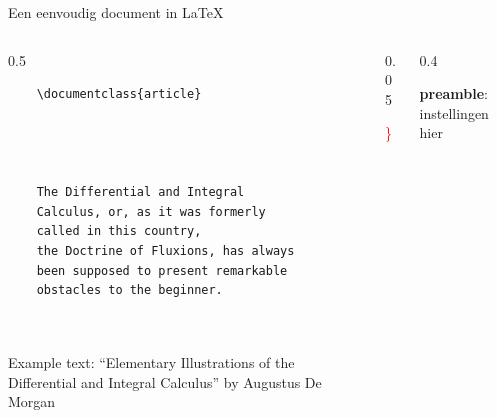 \copyrightTim

\begin{frame}[fragile, t]{Een eenvoudig document in \LaTeX}
	\begin{columns}[t]
        \begin{column}{0.5\textwidth}
			\vspace{-20pt}
	\begin{verbatim} 
	\documentclass{article}

		
	

	The Differential and Integral 
	Calculus, or, as it was formerly 
	called in this country, 
	the Doctrine of Fluxions, has always 
	been supposed to present remarkable 
	obstacles to the beginner.

	
	\end{verbatim}

	{\tiny
	Example text: ``Elementary Illustrations of the Differential and Integral Calculus''
	by Augustus De Morgan
	\par}
\end{column}
\begin{column}{0.05\textwidth}
	\vspace{0pt}

	{\Huge \textcolor{red}{ \} } }
	\\[1.5cm]
	\phantom{{\Huge \textcolor{red}{ \} } }}
	
\end{column}
\begin{column}{0.4\textwidth}
	\vspace{0pt}
	
	\textbf{preamble}: instellingen hier
	\\[1.5cm]
\end{column}
\end{columns}

\end{frame}
